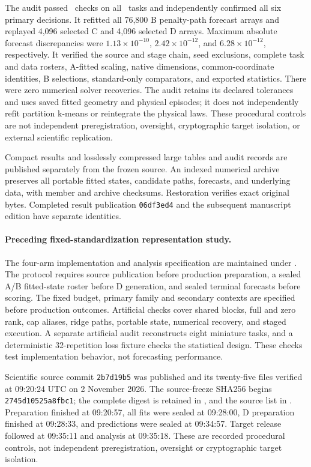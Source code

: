 The audit passed \JSAuditChecks\ checks on all \JSTasks\ tasks
and independently confirmed all six primary decisions. It refitted
all 76,800 B penalty-path forecast arrays and replayed 4,096
selected C and 4,096 selected D arrays. Maximum absolute forecast
discrepancies were $1.13\times10^{-10}$, $2.42\times10^{-12}$,
and $6.28\times10^{-12}$, respectively. It verified the source
and stage chain, seed exclusions, complete task and data rosters,
A-fitted scaling, native dimensions, common-coordinate identities,
B selections, standard-only comparators, and exported statistics.
There were zero numerical solver recoveries. The audit retains
its declared tolerances and uses saved fitted geometry and physical
episodes; it does not independently refit partition k-means or
reintegrate the physical laws. These procedural controls are not
independent preregistration, oversight, cryptographic target
isolation, or external scientific replication.

Compact results and losslessly compressed large tables and audit
records are published separately from the frozen source. An indexed
numerical archive preserves all portable fitted states, candidate
paths, forecasts, and underlying data, with member and archive
checksums. Restoration verifies exact original bytes. Completed
result publication \texttt{06df3ed4} and the subsequent
manuscript edition have separate identities.

\paragraph{Preceding fixed-standardization representation study.}

The four-arm implementation and analysis specification are maintained
under .
The protocol requires source publication before production preparation,
a sealed A/B fitted-state roster before D generation, and sealed
terminal forecasts before scoring. The fixed budget, primary family
and secondary contexts are specified before production outcomes.
Artificial checks cover shared blocks, full and zero rank, cap aliases,
ridge paths, portable state, numerical recovery, and staged execution.
A separate artificial audit reconstructs eight miniature tasks, and
a deterministic 32-repetition loss fixture checks the statistical
design. These checks test implementation behavior, not forecasting
performance.

Scientific source commit \texttt{2b7d19b5} was published and its
twenty-five files verified at 09:20:24 UTC on 2 November 2026.
The source-freeze SHA256 begins \texttt{2745d10525a8fbc1}; the
complete digest is retained in , and the source
list in .
Preparation finished at 09:20:57, all fits were sealed at 09:28:00,
D preparation finished at 09:28:33, and predictions were sealed
at 09:34:57. Target release followed at 09:35:11 and analysis at
09:35:18. These are recorded procedural controls, not independent
preregistration, oversight or cryptographic target isolation.


